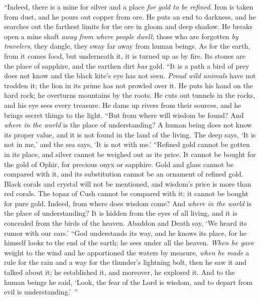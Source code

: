 \begin{biblechapter} %
 “Indeed, there is a mine for silver 
and a place \textit{for gold to be refined}.
\verse Iron is taken from dust, 
and he pours out copper from ore.
\verse He puts an end to darkness, 
and he searches out the farthest limits 
for the ore in gloom and deep shadow.
\verse He breaks open a mine shaft \textit{away from where people dwell}; 
those who are forgotten \textit{by travelers}, 
they dangle, they sway far away from human beings.
\verse As for the earth, from it comes food, 
but underneath it, it is turned up as by fire.
\verse Its stones are the place of sapphire, 
and the earthen dirt \textit{has} gold.
\verse “It is a path a bird of prey does not know 
and the black kite’s eye has not seen.
\verse \textit{Proud wild animals} have not trodden it; 
the lion in its prime has not prowled over it.
\verse He puts his hand on the hard rock; 
he overturns mountains by the roots.
\verse He cuts out tunnels in the rocks, 
and his eye sees every treasure.
\verse He dams up rivers from their sources, 
and he brings secret things to the light.
\verse “But from where will wisdom be found? 
And \textit{where in the world} is the place of understanding?
\verse A human being does not know its proper value, 
and it is not found in the land of the living.
\verse The deep says, ‘It is not in me,’ 
and the sea says, ‘It is not with me.’
\verse “Refined gold cannot be gotten in its place, 
and silver cannot be weighed out as its price.
\verse It cannot be bought for the gold of Ophir, 
for precious onyx or sapphire.
\verse Gold and glass cannot be compared with it, 
and its substitution cannot be an ornament of refined gold.
\verse Black corals and crystal will not be mentioned, 
and wisdom’s price is more than red corals.
\verse The topaz of Cush cannot be compared with it; 
it cannot be bought for pure gold.
\verse Indeed, from where does wisdom come? 
And \textit{where in the world} is the place of understanding?
\verse It is hidden from the eyes of all living, 
and it is concealed from the birds of the heaven.
\verse Abaddon and Death say, 
‘We heard its rumor with our ears.’
\verse “God understands its way, 
and he knows its place,
\verse for he himself looks to the end of the earth; 
he sees under all the heaven.
\verse \textit{When he gave} weight to the wind 
and he apportioned the waters by measure,
\verse \textit{when he made} a rule for the rain 
and a way for the thunder’s lightning bolt,
\verse then he saw it and talked about it; 
he established it, and moreover, he explored it.
\verse And to the human beings he said, 
‘Look, the fear of the Lord is wisdom, 
and to depart from evil is understanding.’ ”
\end{biblechapter}


